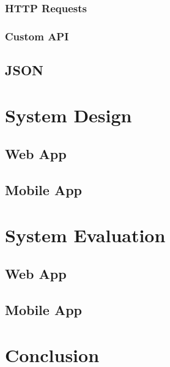 \subsection{HTTP Requests}
\subsection{Custom API}

\section{JSON}	%

\chapter{System Design}	%
\section{Web App}

\section{Mobile App}


\chapter{System Evaluation}	%
\section{Web App}

\section{Mobile App}


\chapter{Conclusion}	%

